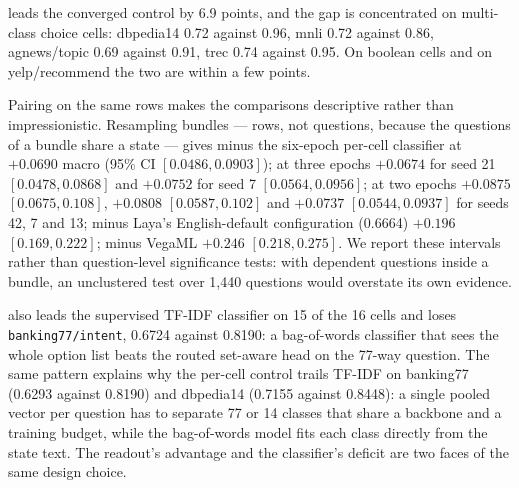 \vsix{} leads the converged control by 6.9 points, and the gap is concentrated on multi-class choice
cells: dbpedia14 0.72 against 0.96, mnli 0.72 against 0.86, agnews/topic 0.69 against 0.91, trec
0.74 against 0.95. On boolean cells and on yelp/recommend the two are within a few points.

Pairing on the same rows makes the comparisons descriptive rather than impressionistic. Resampling
bundles --- rows, not questions, because the questions of a bundle share a state --- gives \vsix{}
minus the six-epoch per-cell classifier at $+0.0690$ macro (95\% CI $[0.0486,0.0903]$); at three
epochs $+0.0674$ for seed 21 $[0.0478,0.0868]$ and $+0.0752$ for seed 7 $[0.0564,0.0956]$; at two
epochs $+0.0875$ $[0.0675,0.108]$, $+0.0808$ $[0.0587,0.102]$ and $+0.0737$ $[0.0544,0.0937]$ for
seeds 42, 7 and 13; minus Laya's English-default configuration (0.6664) $+0.196$ $[0.169,0.222]$;
minus VegaML $+0.246$ $[0.218,0.275]$. We report these intervals rather than question-level
significance tests: with dependent questions inside a bundle, an unclustered test over 1{,}440
questions would overstate its own evidence.

\vsix{} also leads the supervised TF-IDF classifier on 15 of the 16 cells and loses
\texttt{banking77/intent}, 0.6724 against 0.8190: a bag-of-words classifier that sees the whole
option list beats the routed set-aware head on the 77-way question. The same pattern explains why the
per-cell control trails TF-IDF on banking77 (0.6293 against 0.8190) and dbpedia14 (0.7155 against
0.8448): a single pooled vector per question has to separate 77 or 14 classes that share a
backbone and a training budget, while the bag-of-words model fits each class directly from the state
text. The readout's advantage and the classifier's deficit are two faces of the same design choice.

